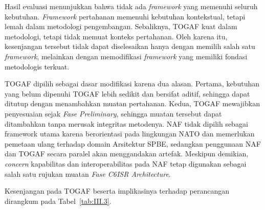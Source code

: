 Hasil evaluasi menunjukkan bahwa tidak ada \textit{framework} yang memenuhi seluruh kebutuhan. \textit{Framework} pertahanan memenuhi kebutuhan kontekstual, tetapi lemah dalam metodologi pengembangan. Sebaliknya, TOGAF kuat dalam metodologi, tetapi tidak memuat konteks pertahanan. Oleh karena itu, kesenjangan tersebut tidak dapat diselesaikan hanya dengan memilih salah satu \textit{framework}, melainkan dengan memodifikasi \textit{framework} yang memiliki fondasi metodologis terkuat.

TOGAF dipilih sebagai dasar modifikasi karena dua alasan. Pertama, kebutuhan yang belum dipenuhi TOGAF lebih sedikit dan bersifat aditif, sehingga dapat ditutup dengan menambahkan muatan pertahanan. Kedua, TOGAF mewajibkan penyesuaian sejak \textit{Fase Preliminary}, sehingga muatan tersebut dapat ditambahkan tanpa merusak integritas metodenya. NAF tidak dipilih sebagai framework utama karena berorientasi pada lingkungan NATO dan memerlukan pemetaan ulang terhadap domain Arsitektur SPBE, sedangkan penggunaan NAF dan TOGAF secara paralel akan menggandakan artefak. Meskipun demikian, \textit{concern} kapabilitas dan interoperabilitas pada NAF tetap digunakan sebagai salah satu rujukan muatan \textit{Fase C6ISR Architecture}.

Kesenjangan pada TOGAF beserta implikasinya terhadap perancangan dirangkum pada Tabel~\ref{tab:III.3}.

